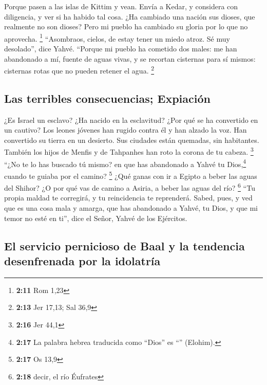 \begin{paracol}{2}
 Porque pasen a las islas de Kittim y vean. Envía a
Kedar, y considera con diligencia, y ver si ha habido tal cosa.
 ¿Ha cambiado una nación sus dioses, que realmente no son
dioses? Pero mi pueblo ha cambiado su gloria por lo que no aprovecha.
\footnote{\textbf{2:11} Rom 1,23}  ``Asombraos, cielos,
de estay tener un miedo atroz. Sé muy desolado'', dice Yahvé.
 ``Porque mi pueblo ha cometido dos males: me han
abandonado a mí, fuente de aguas vivas, y se recortan cisternas para sí
mismos: cisternas rotas que no pueden retener el agua. \footnote{\textbf{2:13}
  Jer 17,13; Sal 36,9}

\hypertarget{las-terribles-consecuencias-expiaciuxf3n}{%
\subsection{Las terribles consecuencias;
Expiación}\label{las-terribles-consecuencias-expiaciuxf3n}}

 ¿Es Israel un esclavo? ¿Ha nacido en la esclavitud? ¿Por
qué se ha convertido en un cautivo?  Los leones jóvenes
han rugido contra él y han alzado la voz. Han convertido su tierra en un
desierto. Sus ciudades están quemadas, sin habitantes. 
También los hijos de Menfis y de Tahpanhes han roto la corona de tu
cabeza. \footnote{\textbf{2:16} Jer 44,1}  ``¿No te lo
has buscado tú mismo? en que has abandonado a Yahvé tu Dios,\footnote{\textbf{2:17}
  La palabra hebrea traducida como ``Dios'' es ``''
  (Elohim).} cuando te guiaba por el camino? \footnote{\textbf{2:17} Os
  13,9}  ¿Qué ganas con ir a Egipto a beber las aguas del
Shihor? ¿O por qué vas de camino a Asiria, a beber las aguas del río?
\footnote{\textbf{2:18} decir, el río Éufrates}  ``Tu
propia maldad te corregirá, y tu reincidencia te reprenderá. Sabed,
pues, y ved que es una cosa mala y amarga, que has abandonado a Yahvé,
tu Dios, y que mi temor no esté en ti'', dice el Señor, Yahvé de los
Ejércitos.

\hypertarget{el-servicio-pernicioso-de-baal-y-la-tendencia-desenfrenada-por-la-idolatruxeda}{%
\subsection{El servicio pernicioso de Baal y la tendencia desenfrenada
por la
idolatría}\label{el-servicio-pernicioso-de-baal-y-la-tendencia-desenfrenada-por-la-idolatruxeda}}


\end{paracol}
